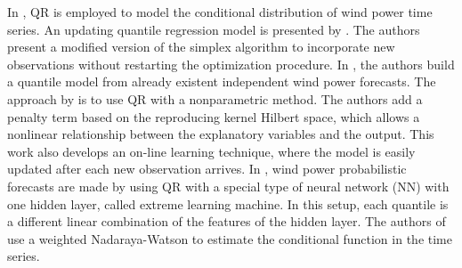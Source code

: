%






In \cite{gallego2016line,moller_time-adaptive_2008,nielsen2006,bremnes_probabilistic_2004,wan_direct_2017}, QR is employed to model the conditional distribution of wind power time series.
An updating quantile regression model is presented by \cite{moller_time-adaptive_2008}. The authors present a modified version of the simplex algorithm to incorporate new observations without restarting the optimization procedure.
In \cite{nielsen2006}, the authors build a quantile model from already existent independent wind power forecasts.
The approach by \cite{gallego2016line} is to use QR with a nonparametric method. The authors add a penalty term based on the reproducing kernel Hilbert space, which allows a nonlinear relationship between the explanatory variables and the output. This work also develops an on-line learning technique, where the model is easily updated after each new observation arrives.
In \cite{wan_direct_2017}, wind power probabilistic forecasts are made by using QR with a special type of neural network (NN) with one hidden layer, called extreme learning machine. In this setup, each quantile is a different linear combination of the features of the hidden layer.
The authors of \cite{cai_regression_2002} use a weighted Nadaraya-Watson to estimate the conditional function in the time series.




